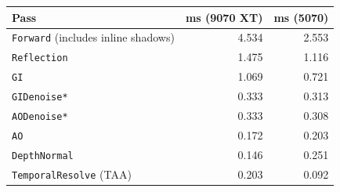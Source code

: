 \begin{tabular}{lrr}
\toprule
Pass & ms (9070 XT) & ms (5070) \\
\midrule
\texttt{Forward} (includes inline shadows) & 4.534 & 2.553 \\
\texttt{Reflection} & 1.475 & 1.116 \\
\texttt{GI} & 1.069 & 0.721 \\
\texttt{GIDenoise*} & 0.333 & 0.313 \\
\texttt{AODenoise*} & 0.333 & 0.308 \\
\texttt{AO} & 0.172 & 0.203 \\
\texttt{DepthNormal} & 0.146 & 0.251 \\
\texttt{TemporalResolve} (TAA) & 0.203 & 0.092 \\
\bottomrule
\end{tabular}
